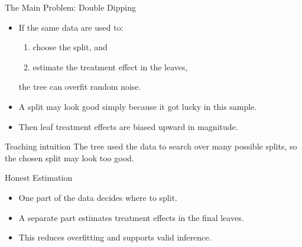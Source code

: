 \documentclass[hyperref={pdfpagelabels=false}]{beamer}
\begin{document}
\begin{frame}{The Main Problem: Double Dipping}
\begin{itemize}
  \item If the same data are used to:
  \begin{enumerate}
    \item choose the split, and
    \item estimate the treatment effect in the leaves,
  \end{enumerate}
  the tree can overfit random noise.
  \vspace{0.3cm}
  \item A split may look good simply because it got lucky in this sample.
  \vspace{0.3cm}
  \item Then leaf treatment effects are biased upward in magnitude.
\end{itemize}

\vspace{0.25cm}
\begin{block}{Teaching intuition}
The tree used the data to search over many possible splits, so the chosen split may look too good.
\end{block}
\end{frame}

\begin{frame}{Honest Estimation}
\begin{center}
\end{center}

\vspace{0.2cm}
\begin{itemize}
  \item One part of the data decides where to split.
  \item A separate part estimates treatment effects in the final leaves.
  \item This reduces overfitting and supports valid inference.
\end{itemize}
\end{frame}
\end{document}
